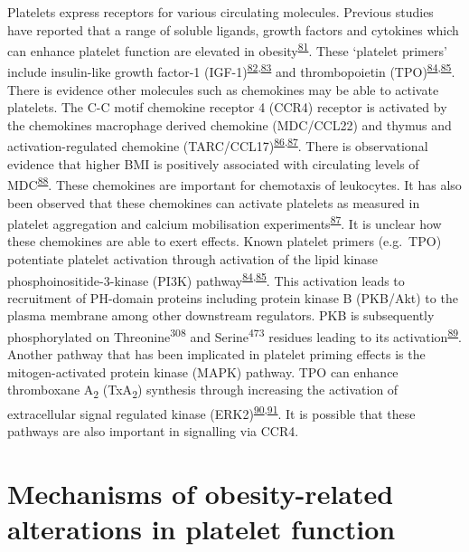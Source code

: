 \documentclass[11pt,twoside]{bristolthesis}
\begin{document}
Platelets express receptors for various circulating molecules. Previous studies have reported that a range of soluble ligands, growth factors and cytokines which can enhance platelet function are elevated in obesity\textsuperscript{\protect\hyperlink{ref-Maury2010a}{81}}. These `platelet primers' include insulin-like growth factor-1 (IGF-1)\textsuperscript{\protect\hyperlink{ref-Frystyk1995}{82},\protect\hyperlink{ref-Hers2007}{83}} and thrombopoietin (TPO)\textsuperscript{\protect\hyperlink{ref-Blair2015}{84},\protect\hyperlink{ref-Pasquet2000}{85}}. There is evidence other molecules such as chemokines may be able to activate platelets. The C-C motif chemokine receptor 4 (CCR4) receptor is activated by the chemokines macrophage derived chemokine (MDC/CCL22) and thymus and activation-regulated chemokine (TARC/CCL17)\textsuperscript{\protect\hyperlink{ref-Kowalska2000}{86},\protect\hyperlink{ref-Abi-Younes2001}{87}}. There is observational evidence that higher BMI is positively associated with circulating levels of MDC\textsuperscript{\protect\hyperlink{ref-Kitahara2014}{88}}. These chemokines are important for chemotaxis of leukocytes. It has also been observed that these chemokines can activate platelets as measured in platelet aggregation and calcium mobilisation experiments\textsuperscript{\protect\hyperlink{ref-Abi-Younes2001}{87}}. It is unclear how these chemokines are able to exert effects. Known platelet primers (e.g.~TPO) potentiate platelet activation through activation of the lipid kinase phosphoinositide-3-kinase (PI3K) pathway\textsuperscript{\protect\hyperlink{ref-Blair2015}{84},\protect\hyperlink{ref-Pasquet2000}{85}}. This activation leads to recruitment of PH-domain proteins including protein kinase B (PKB/Akt) to the plasma membrane among other downstream regulators. PKB is subsequently phosphorylated on Threonine\textsuperscript{308} and Serine\textsuperscript{473} residues leading to its activation\textsuperscript{\protect\hyperlink{ref-Hemmings2015}{89}}. Another pathway that has been implicated in platelet priming effects is the mitogen-activated protein kinase (MAPK) pathway. TPO can enhance thromboxane A\textsubscript{2} (TxA\textsubscript{2}) synthesis through increasing the activation of extracellular signal regulated kinase (ERK2)\textsuperscript{\protect\hyperlink{ref-Ezumi1998}{90},\protect\hyperlink{ref-VanWilligen2000}{91}}. It is possible that these pathways are also important in signalling via CCR4.

\hypertarget{mechanisms-of-obesity-related-alterations-in-platelet-function}{%
\section{Mechanisms of obesity-related alterations in platelet function}\label{mechanisms-of-obesity-related-alterations-in-platelet-function}}
\end{document}
